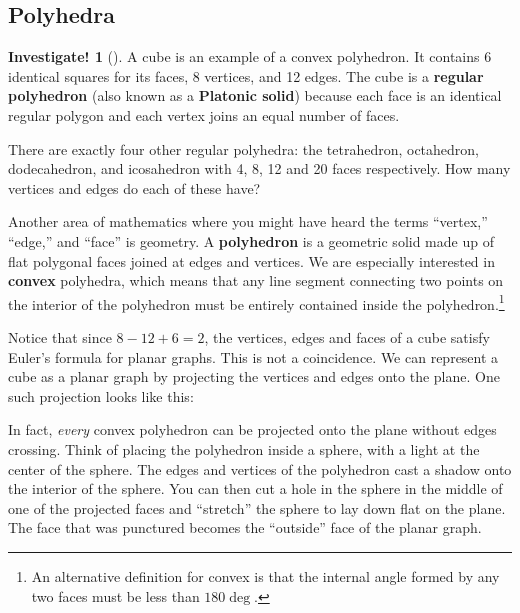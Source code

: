 \documentclass[10pt,]{book}
\newcommand{\terminology}[1]{\textbf{#1}}
\theoremstyle{plain}
\theoremstyle{definition}
\theoremstyle{definition}
\theoremstyle{definition}
\newtheorem{investigation}[project]{Investigate!}
\theoremstyle{definition}
\numberwithin{equation}{chapter}
\newcommand{\vtx}[2]{node[fill,circle,inner sep=0pt, minimum size=4pt,label=#1:#2]{}}
\renewcommand{\v}{\vtx{above}{}}
\begin{document}
\subsection[{Polyhedra}]{Polyhedra}\label{subsection-9}
\begin{investigation}[]\label{investigation-4}
\hypertarget{p-263}{}%
A cube is an example of a convex polyhedron. It contains 6 identical squares for its faces, 8 vertices, and 12 edges. The cube is a \terminology{regular polyhedron} (also known as a \terminology{Platonic solid}) because each face is an identical regular polygon and each vertex joins an equal number of faces.%
\par
\hypertarget{p-264}{}%
There are exactly four other regular polyhedra: the tetrahedron, octahedron, dodecahedron, and icosahedron with 4, 8, 12 and 20 faces respectively. How many vertices and edges do each of these have?%
\end{investigation}
\hypertarget{p-265}{}%
Another area of mathematics where you might have heard the terms ``vertex,'' ``edge,'' and ``face'' is geometry. A \terminology{polyhedron} is a geometric solid made up of flat polygonal faces joined at edges and vertices. We are especially interested in \terminology{convex} polyhedra, which means that any line segment connecting two points on the interior of the polyhedron must be entirely contained inside the polyhedron.\footnote{An alternative definition for convex is that the internal angle formed by any two faces must be less than \(180\deg\).\label{fn-2}}%
\par
\hypertarget{p-266}{}%
Notice that since \(8 - 12 + 6 = 2\), the vertices, edges and faces of a cube satisfy Euler's formula for planar graphs. This is not a coincidence. We can represent a cube as a planar graph by projecting the vertices and edges onto the plane. One such projection looks like this:%
\begin{sidebyside}{1}{0.4}{0.4}{0}
\begin{sbspanel}{0.2}
\resizebox{\linewidth}{!}{{
\begin{tikzpicture}
  \foreach \ang in {45, 135, 225, 315} {
  \draw (\ang:.4) \v -- (\ang:1) \v -- (\ang+90:1) (\ang:.4) -- (\ang+90:.4);
  }
  \end{tikzpicture}
}
}
\end{sbspanel}
\end{sidebyside}
\par
\hypertarget{p-267}{}%
In fact, \emph{every} convex polyhedron can be projected onto the plane without edges crossing. Think of placing the polyhedron inside a sphere, with a light at the center of the sphere. The edges and vertices of the polyhedron cast a shadow onto the interior of the sphere. You can then cut a hole in the sphere in the middle of one of the projected faces and ``stretch'' the sphere to lay down flat on the plane. The face that was punctured becomes the ``outside'' face of the planar graph.%
\end{document}
